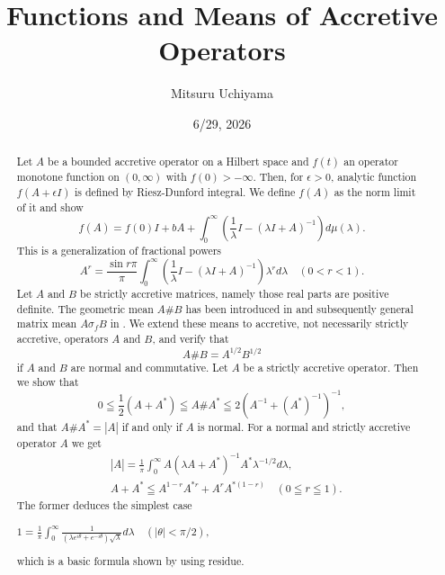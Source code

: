 \documentclass[reqno]{amsart}
\theoremstyle{definition}
\theoremstyle{remark}
\begin{document}
\title{ Functions and Means of Accretive Operators} 

\author{Mitsuru Uchiyama}
\address{Shimane Univ. Matsue, and Ritsumeikan Univ. Otsu, Japan} 
\address{Shimane Univ. Matsue, and Ritsumeikan Univ. Otsu, Japan} 
\date{6/29, 2026}



\begin{abstract}
Let $A$ be a bounded accretive operator on a Hilbert space and 
$f(t)$ an operator monotone function on $(0, \infty)$ with $f(0)>-\infty$. 
Then, for $\epsilon >0$, analytic function $f (A+\epsilon I) $ is defined by Riesz-Dunford integral. 
We define $f(A)$ as the norm limit of it and show    
$$ f(A) = f(0)I + b A + \int_0^{\infty} (\frac{1}{\lambda} I - (\lambda I + A)^{-1})
d\mu(\lambda).$$
This is a generalization of fractional powers 
$$A^r = \frac{\sin r \pi}{\pi} \int_0^{\infty} 
 (\frac{1}{\lambda} I - (\lambda I + A)^{-1}) \lambda ^{r} d\lambda \quad (0<r<1).$$
Let $A$ and $B$ be strictly accretive matrices, namely those real parts are positive definite.
 The geometric mean 
$A\# B$ has been introduced in \cite{Drury} and subsequently general matrix mean 
$A\sigma_f B$ in \cite{BKS1}. 
We extend these means to accretive, not necessarily strictly accretive, operators $A$ 
and $B$, and verify that   
$$A\# B= A^{1/2} B^{1/2}$$
 if $A$ and $B$ are normal and commutative. 
Let $A$ be a strictly accretive operator. Then we show that 
$$0 \leqq \frac{1}{2} (A + A^*) \leqq  A \# A^* \leqq 2(A^{-1} + (A^*)^{-1})^{-1},$$
and that $A \# A^* = | A |$ if and only if $A$ is normal. 
For a normal and strictly accretive operator $A$ we get
\begin{align*}
&|A|=  \frac{1}{\pi}\int_0^{\infty}A (\lambda A + A^*)^{-1} A^* 
\lambda^{-1/2} d \lambda, \\
&A + A^* \leqq   A^{1-r} A^{*r} + A^r A^{*(1-r)} \quad (0\leqq r \leqq 1).
\end{align*}
The former deduces the simplest case  
\begin{center}
$1 = \frac{1}{\pi} \int_0^{\infty} \frac{1}{(\lambda e^{i\theta}  +  e^{-i\theta})
\sqrt{\lambda} } d \lambda \quad (|\theta | < \pi/2), $
\end{center}
which is a basic formula shown by using residue.

\end{abstract}
\end{document}
